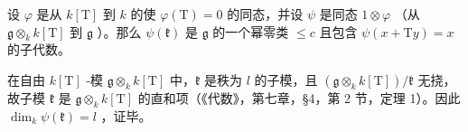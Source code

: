设 \(\varphi\) 是从 \(k[\mathrm{T}]\) 到 \(k\) 的使 \(\varphi (\mathrm{T}) = 0\) 的同态，并设 \(\psi\) 是同态 \(1\otimes \varphi\) （从 \(\mathfrak{g}\otimes_k k[\mathrm{T}]\) 到 \(\mathfrak{g}\) ）。那么 \(\psi (\mathfrak{k})\) 是 \(\mathfrak{g}\) 的一个幂零类 \(\leq c\) 且包含 \(\psi (x + \mathrm{T}y) = x\) 的子代数。

在自由 \(k[\mathrm{T}]\) -模 \(\mathfrak{g} \otimes_k k[\mathrm{T}]\) 中，\(\mathfrak{k}\) 是秩为 \(l\) 的子模，且 \((\mathfrak{g} \otimes_k k[\mathrm{T}]) / \mathfrak{k}\) 无挠，故子模 \(\mathfrak{k}\) 是 \(\mathfrak{g} \otimes_k k[\mathrm{T}]\) 的直和项（《代数》，第七章，§4，第 2 节，定理 1）。因此 \(\dim_k \psi(\mathfrak{k}) = l\) ，证毕。
